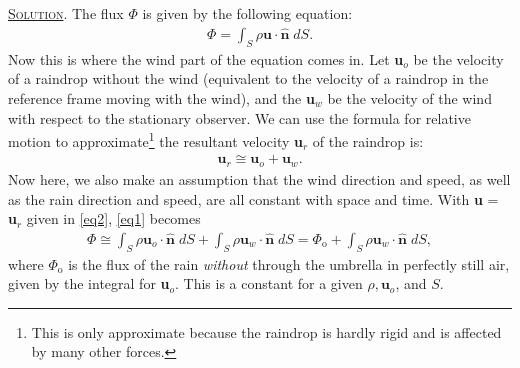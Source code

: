 \documentclass[11pt]{article}
\begin{document}
\subsection[Solution]{} \textsc{\underline{Solution}}. The flux $\Phi$ is given by the following equation:
\begin{align} \label{eq1}
\Phi = \int_S \rho\textbf{u} \cdot \hat{\textbf{n}}\; dS.
\end{align}
Now this is where the wind part of the equation comes in. Let \textbf{u}$_o$ be the velocity of a raindrop without the wind (equivalent to the velocity of a raindrop in the reference frame moving with the wind), and the \textbf{u}$_w$ be the velocity of the wind with respect to the stationary observer. We can use the formula for relative motion to approximate\footnote{This is only approximate because the raindrop is hardly rigid and is affected by many other forces.} the resultant velocity \textbf{u}$_r$ of the raindrop is:
\begin{align} \label{eq2}
\textbf{u}_r \cong \textbf{u}_o + \textbf{u}_w.
\end{align}
Now here, we also make an assumption that the wind direction and speed, as well as the rain direction and speed, are all constant with space and time. With \textbf{u} = \textbf{u}$_r$ given in \eqref{eq2}, \eqref{eq1} becomes
\begin{align} \label{eq3}
\Phi \cong \int_S \rho\textbf{u}_o \cdot \hat{\textbf{n}}\; dS + \int_S \rho\textbf{u}_w \cdot \hat{\textbf{n}}\; dS = \Phi_{\text{o}} + \int_S \rho\textbf{u}_w \cdot \hat{\textbf{n}}\; dS,
\end{align}
where $\Phi_\text{o}$ is the flux of the rain \textit{without} through the umbrella in perfectly still air, given by the integral for \textbf{u}$_o$. This is a constant for a given $\rho, \textbf{u}_o$, and $S$.
\end{document}

